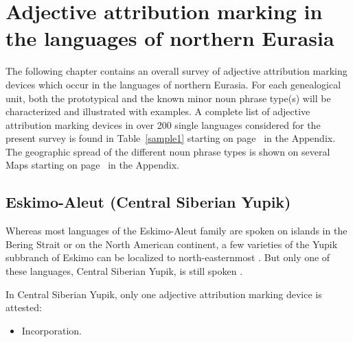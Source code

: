 
\chapter[The languages of northern Eurasia]{Adjective attribution marking in the languages of northern Eurasia}

The following chapter contains an overall survey of adjective attribution marking devices which occur in the languages of northern Eurasia. For each genealogical unit, both the prototypical and the known minor noun phrase type(s) will be characterized and illustrated with examples. A complete list of adjective attribution marking devices in over 200 single languages considered for the present survey is found in Table~\ref{sample1} starting on page~\pageref{sample1} in the Appendix. The geographic spread of the different noun phrase types is shown on several Maps starting on page~\pageref{WorldMap} in the Appendix.

\section{Eskimo-Aleut (Central Siberian Yupik)}
Whereas most languages of the Eskimo-Aleut family are spoken on islands in the Bering Strait or on the North American continent, a few varieties of the Yupik subbranch of Eskimo can be localized to north-easternmost . But only one of these languages, Central Siberian Yupik, is still spoken \cite[224]{salminen2007}.

In Central Siberian Yupik, only one adjective attribution marking device is attested:
\begin{itemize}
\item Incorporation.
\end{itemize}

